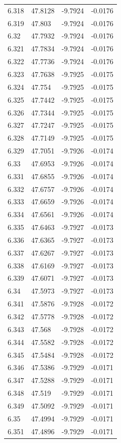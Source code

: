 \begin{tabular}{llll}
6.318 & 47.8128 & -9.7924 & -0.0176 \\
6.319 & 47.803 & -9.7924 & -0.0176 \\
6.32 & 47.7932 & -9.7924 & -0.0176 \\
6.321 & 47.7834 & -9.7924 & -0.0176 \\
6.322 & 47.7736 & -9.7924 & -0.0176 \\
6.323 & 47.7638 & -9.7925 & -0.0175 \\
6.324 & 47.754 & -9.7925 & -0.0175 \\
6.325 & 47.7442 & -9.7925 & -0.0175 \\
6.326 & 47.7344 & -9.7925 & -0.0175 \\
6.327 & 47.7247 & -9.7925 & -0.0175 \\
6.328 & 47.7149 & -9.7925 & -0.0175 \\
6.329 & 47.7051 & -9.7926 & -0.0174 \\
6.33 & 47.6953 & -9.7926 & -0.0174 \\
6.331 & 47.6855 & -9.7926 & -0.0174 \\
6.332 & 47.6757 & -9.7926 & -0.0174 \\
6.333 & 47.6659 & -9.7926 & -0.0174 \\
6.334 & 47.6561 & -9.7926 & -0.0174 \\
6.335 & 47.6463 & -9.7927 & -0.0173 \\
6.336 & 47.6365 & -9.7927 & -0.0173 \\
6.337 & 47.6267 & -9.7927 & -0.0173 \\
6.338 & 47.6169 & -9.7927 & -0.0173 \\
6.339 & 47.6071 & -9.7927 & -0.0173 \\
6.34 & 47.5973 & -9.7927 & -0.0173 \\
6.341 & 47.5876 & -9.7928 & -0.0172 \\
6.342 & 47.5778 & -9.7928 & -0.0172 \\
6.343 & 47.568 & -9.7928 & -0.0172 \\
6.344 & 47.5582 & -9.7928 & -0.0172 \\
6.345 & 47.5484 & -9.7928 & -0.0172 \\
6.346 & 47.5386 & -9.7929 & -0.0171 \\
6.347 & 47.5288 & -9.7929 & -0.0171 \\
6.348 & 47.519 & -9.7929 & -0.0171 \\
6.349 & 47.5092 & -9.7929 & -0.0171 \\
6.35 & 47.4994 & -9.7929 & -0.0171 \\
6.351 & 47.4896 & -9.7929 & -0.0171 \\

\end{tabular}
